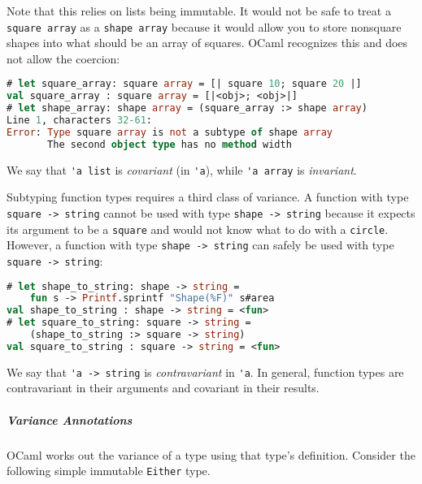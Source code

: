Note that this relies on lists being immutable. It would not be safe to
treat a \passthrough{\lstinline!square array!} as a
\passthrough{\lstinline!shape array!} because it would allow you to
store nonsquare shapes into what should be an array of squares. OCaml
recognizes this and does not allow the coercion:

\begin{lstlisting}[language=Caml]
# let square_array: square array = [| square 10; square 20 |]
val square_array : square array = [|<obj>; <obj>|]
# let shape_array: shape array = (square_array :> shape array)
Line 1, characters 32-61:
Error: Type square array is not a subtype of shape array
       The second object type has no method width
\end{lstlisting}

We say that \passthrough{\lstinline!'a list!} is \emph{covariant} (in
\passthrough{\lstinline!'a!}), while \passthrough{\lstinline!'a array!}
is \emph{invariant}. 

Subtyping function types requires a third class of variance. A function
with type \passthrough{\lstinline!square -> string!} cannot be used with
type \passthrough{\lstinline!shape -> string!} because it expects its
argument to be a \passthrough{\lstinline!square!} and would not know
what to do with a \passthrough{\lstinline!circle!}. However, a function
with type \passthrough{\lstinline!shape -> string!} can safely be used
with type \passthrough{\lstinline!square -> string!}:

\begin{lstlisting}[language=Caml]
# let shape_to_string: shape -> string =
    fun s -> Printf.sprintf "Shape(%F)" s#area
val shape_to_string : shape -> string = <fun>
# let square_to_string: square -> string =
    (shape_to_string :> square -> string)
val square_to_string : square -> string = <fun>
\end{lstlisting}

We say that \passthrough{\lstinline!'a -> string!} is
\emph{contravariant} in \passthrough{\lstinline!'a!}. In general,
function types are contravariant in their arguments and covariant in
their results. 

\hypertarget{variance-annotations}{%
\subparagraph{Variance Annotations}\label{variance-annotations}}

OCaml works out the variance of a type using that type's definition.
Consider the following simple immutable \passthrough{\lstinline!Either!}
type.

